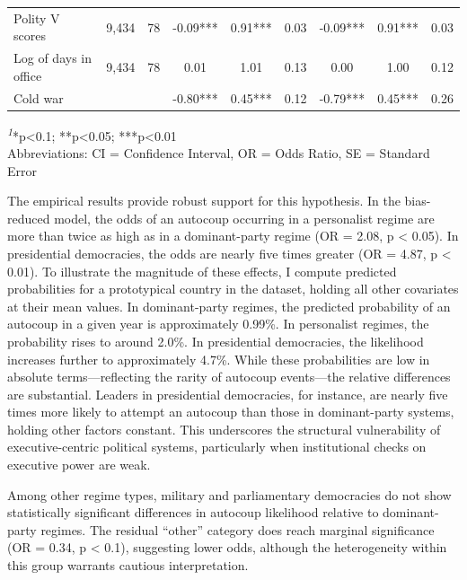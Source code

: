\documentclass[
  12pt,
]{report}
\begin{document}
\begin{table}
{\begin{tabular*}{\linewidth}{@{\extracolsep{\fill}}lcccccccc}
Polity V scores & 9,434 & 78 & -0.09*** & 0.91*** & 0.03 & -0.09*** & 0.91*** & 0.03 \\ 
Log of days in office & 9,434 & 78 & 0.01 & 1.01 & 0.13 & 0.00 & 1.00 & 0.12 \\ 
Cold war &  &  & -0.80*** & 0.45*** & 0.12 & -0.79*** & 0.45*** & 0.26 \\ 
\bottomrule
\end{tabular*}
\begin{minipage}{\linewidth}
\textsuperscript{\textit{1}}*p\textless{}0.1; **p\textless{}0.05; ***p\textless{}0.01\\
Abbreviations: CI = Confidence Interval, OR = Odds Ratio, SE = Standard Error\\
\end{minipage}

}

\end{table}%

The empirical results provide robust support for this hypothesis. In the
bias-reduced model, the odds of an autocoup occurring in a personalist
regime are more than twice as high as in a dominant-party regime (OR =
2.08, p \textless{} 0.05). In presidential democracies, the odds are
nearly five times greater (OR = 4.87, p \textless{} 0.01). To illustrate
the magnitude of these effects, I compute predicted probabilities for a
prototypical country in the dataset, holding all other covariates at
their mean values. In dominant-party regimes, the predicted probability
of an autocoup in a given year is approximately 0.99\%. In personalist
regimes, the probability rises to around 2.0\%. In presidential
democracies, the likelihood increases further to approximately 4.7\%.
While these probabilities are low in absolute terms---reflecting the
rarity of autocoup events---the relative differences are substantial.
Leaders in presidential democracies, for instance, are nearly five times
more likely to attempt an autocoup than those in dominant-party systems,
holding other factors constant. This underscores the structural
vulnerability of executive-centric political systems, particularly when
institutional checks on executive power are weak.

Among other regime types, military and parliamentary democracies do not
show statistically significant differences in autocoup likelihood
relative to dominant-party regimes. The residual ``other'' category does
reach marginal significance (OR = 0.34, p \textless{} 0.1), suggesting
lower odds, although the heterogeneity within this group warrants
cautious interpretation.
\end{document}
